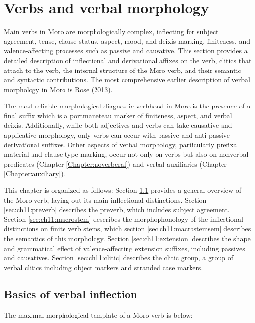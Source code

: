 \chapter{Verbs and verbal morphology}\label{chapter:verbs}

Main verbs in Moro are morphologically complex, inflecting for subject agreement, tense, clause status, aspect, mood, and deixis marking, finiteness, and valence-affecting processes such as passive and causative. This section provides a detailed description of  inflectional and derivational affixes on the verb, clitics that attach to the verb, the internal structure of the Moro verb, and their semantic and syntactic contributions. The most comprehensive earlier description of verbal morphology in Moro is Rose (2013). 

The most reliable morphological diagnostic verbhood in Moro is the presence of a final suffix which is a portmaneteau marker of finiteness, aspect, and verbal deixis. Additionally, while both adjectives and verbs can take causative and applicative morphology, only verbs can occur with passive and anti-passive derivational suffixes. Other aspects of verbal morphology, particularly prefixal material and clause type marking, occur not only on verbs but also on nonverbal predicates (Chapter \ref{Chapter:noverberal}) and verbal auxiliaries (Chapter \ref{Chapter:auxiliary}).

This chapter is organized as follows: Section \ref{sec:ch11:inflection} provides a general overview of the Moro verb, laying out its main inflectional distinctions. Section \ref{sec:ch11:preverb} describes the preverb, which includes subject agreement. Section \ref{sec:ch11:macrostem} describes the morphophonology of the inflectional distinctions on finite verb stems, which section \ref{sec:ch11:macrostemsem} describes the semantics of this morphology. Section \ref{sec:ch11:extension} describes the shape and grammatical effect of valence-affecting extension suffixes, including passives and causatives. Section \ref{sec:ch11:clitic} describes the clitic group, a group of verbal clitics including object markers and stranded case markers.


\section{Basics of verbal inflection}\label{sec:ch11:inflection}

The maximal morphological template of a Moro verb is below:

